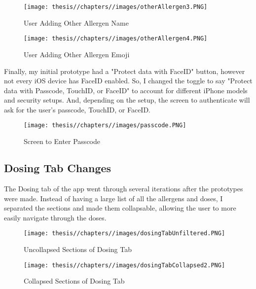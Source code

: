 \begin{figure} [H]
    \centering
    \texttt{[image: thesis//chapters//images/otherAllergen3.PNG]}
    \caption{User Adding Other Allergen Name}
 
\end{figure}

\begin{figure} [H]
    \centering
    \texttt{[image: thesis//chapters//images/otherAllergen4.PNG]}
    \caption{User Adding Other Allergen Emoji}
 
\end{figure}

Finally, my initial prototype had a "Protect data with FaceID" button, however not every iOS device has FaceID enabled. So, I changed the toggle to say "Protect data with Passcode, TouchID, or FaceID" to account for different iPhone models and security setups. And, depending on the setup, the screen to authenticate will ask for the user's passcode, TouchID, or FaceID.

\begin{figure} [H]
    \centering
    \texttt{[image: thesis//chapters//images/passcode.PNG]}
    \caption{Screen to Enter Passcode}
 
\end{figure}

\subsection{Dosing Tab Changes}

The Dosing tab of the app went through several iterations after the prototypes were made. Instead of having a large list of all the allergens and doses, I separated the sections and made them collapsable, allowing the user to more easily navigate through the doses.

\begin{figure} [H]
    \centering
    \texttt{[image: thesis//chapters//images/dosingTabUnfiltered.PNG]}
    \caption{Uncollapsed Sections of Dosing Tab}
 
\end{figure}

\begin{figure} [H]
    \centering
    \texttt{[image: thesis//chapters//images/dosingTabCollapsed2.PNG]}
    \caption{Collapsed Sections of Dosing Tab}
 
\end{figure}


